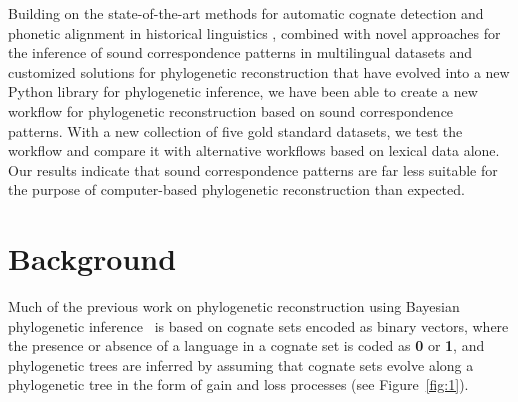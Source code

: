\documentclass[10pt, a4paper]{article}
\begin{document}
Building on the state-of-the-art methods for automatic cognate detection and phonetic alignment in historical linguistics \citep{List2016g}, combined with novel approaches for the inference of sound correspondence patterns in multilingual datasets \citep{List2019a} and customized solutions for phylogenetic reconstruction \citep{Rama2019} that have evolved into a new Python library for phylogenetic inference, we have been able to create a new workflow for phylogenetic reconstruction based on sound correspondence patterns.  With a new collection of five gold standard datasets, we test the workflow and compare it with alternative workflows based on lexical data alone. Our results indicate that sound correspondence patterns are far less suitable for the purpose of computer-based phylogenetic reconstruction than expected.






\section{Background}\label{sec:motiv}

Much of the previous work on phylogenetic reconstruction using Bayesian phylogenetic inference~\cite{Kolipakam2018,Sagart2019,rama2018automatic} is based on cognate sets encoded as binary vectors, where the presence or absence of a language in a cognate set is coded as \textbf{0} or \textbf{1}, and phylogenetic trees are inferred by assuming that cognate sets evolve along a phylogenetic tree in the form of gain and loss processes (see Figure~\ref{fig:1}).
\end{document}

